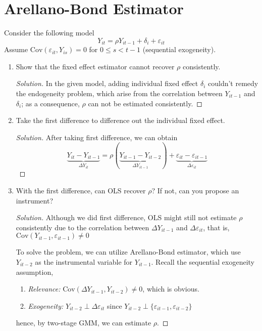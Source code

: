 \documentclass[11pt]{article}
\newenvironment{solution}{%
  \renewcommand\qedsymbol{$\blacksquare$}%
  \begin{mdframed}[backgroundcolor=gray!15]%
  \begin{proof}[Solution]}%
  {\end{proof}%
  \end{mdframed}}%
\newcommand{\cov}{\text{Cov}}
\begin{document}
\section{Arellano-Bond Estimator}

    Consider the following model
    \[ 
        Y_{it} = \rho Y_{it-1} + \delta_i + \varepsilon_{it} 
    \]
    Assume \( \text{Cov}(\varepsilon_{it}, Y_{is}) = 0 \) for \( 0 \leq s < t-1 \) (sequential exogeneity).

    \begin{enumerate}

        \item Show that the fixed effect estimator cannot recover \( \rho \) consistently.
        
            \begin{solution}
                In the given model, adding individual fixed effect $\delta_i$ couldn't remedy the endogeneity problem, which arise from the correlation between $Y_{it-1}$ and $\delta_i$; as a consequence, $\rho$ can not be estimated consistently.
            \end{solution}
            
        
        \item Take the first difference to difference out the individual fixed effect.
        
            \begin{solution}
                After taking first difference, we can obtain
                \[
                    \underbrace{Y_{it} - Y_{it-1}}_{\Delta Y_{it}} = \rho(\underbrace{Y_{it-1} - Y_{it-2}}_{\Delta Y_{it-1}}) + \underbrace{\varepsilon_{it} - \varepsilon_{it-1}}_{\Delta \varepsilon_{it}}
                \]
            \end{solution}
        
        \item With the first difference, can OLS recover \( \rho \)? If not, can you propose an instrument?
            
            \begin{solution}
                Although we did first difference, OLS might still not estimate $\rho$ consistently due to the correlation between $\Delta Y_{it-1}$ and $\Delta \varepsilon_{it}$, that is, $\cov(Y_{it-1}, \varepsilon_{it-1}) \neq 0$

                To solve the problem, we can utilize Arellano-Bond estimator, which use $Y_{it-2}$ as the instrumental variable for $Y_{it-1}$. Recall the sequential exogeneity assumption, 
                \begin{enumerate}
                    \item {\it Relevance:} $\cov(\Delta Y_{it-1}, Y_{it-2}) \neq 0$, which is obvious.
                    \item {\it Exogeneity:} $Y_{it-2} \perp \Delta\varepsilon_{it}$ since $Y_{it-2} \perp \{\varepsilon_{it-1},\varepsilon_{it-2}\}$
                \end{enumerate}
                hence, by two-stage GMM, we can estimate $\rho$.
            \end{solution}


\end{enumerate}
\end{document}

